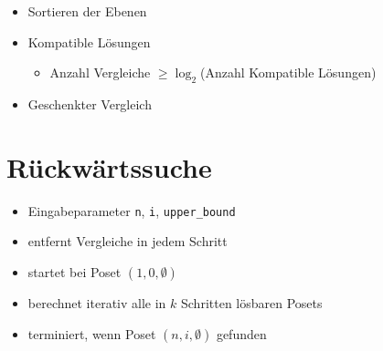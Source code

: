 \begin{frame}{\insertsubsection}

  \begin{itemize}
    \item<+-> Sortieren der Ebenen
    \item<+-> Kompatible Lösungen
      \begin{itemize}
        \item Anzahl Vergleiche $\geq \log_2$(Anzahl Kompatible Lösungen)
      \end{itemize}
    \item<+-> Geschenkter Vergleich
      \begin{figure}
        \centering
      \end{figure}
  \end{itemize}

\end{frame}


\section{Rückwärtssuche}
\sectionframe{\insertsection}
\begin{frame}{\insertsection}
  \begin{itemize}
    \item<+-> Eingabeparameter \texttt{n}, \texttt{i}, \texttt{upper\_bound}
    \item<+-> entfernt Vergleiche in jedem Schritt
    \item<+-> startet bei Poset $(1, 0, \emptyset)$ %
    \item<+-> berechnet iterativ alle in $k$ Schritten lösbaren Posets %
    \item<+-> terminiert, wenn Poset $(n, i, \emptyset)$ gefunden %
  \end{itemize}
\end{frame}

